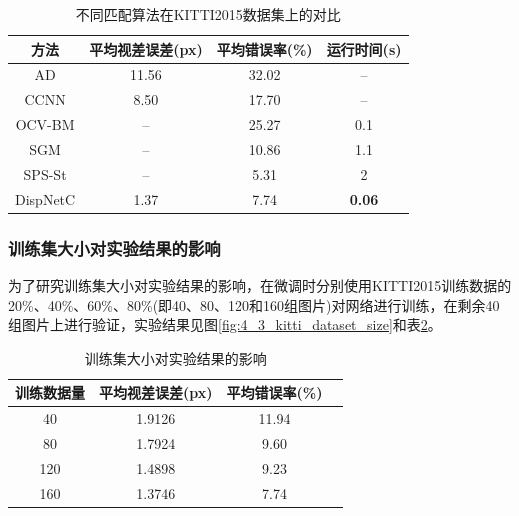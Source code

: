 \begin{table}[!htb]
	\centering
	\caption{不同匹配算法在KITTI2015数据集上的对比}
	\label{tab:4_3_cmp_kitti}
		\begin{tabular}{|c|c|c|c|}\hline
			方法          & 平均视差误差(px) & 平均错误率(\%) & 运行时间(s) \\\hline
			AD            & 11.56                      & 32.02                 & --      \\
			CCNN      & 8.50                       & 17.70                  & --      \\
			OCV-BM &  --                           & 25.27                  &  0.1    \\
			SGM         & --                            & 10.86                 &  1.1     \\
			SPS-St    & --                            & 5.31                    & 2         \\
			DispNetC & 1.37                       & 7.74                   & \textbf{0.06}  \\\hline
		\end{tabular}
\end{table}


\subsubsection{训练集大小对实验结果的影响}
为了研究训练集大小对实验结果的影响，在微调时分别使用KITTI2015训练数据的20\%、40\%、60\%、80\%(即40、80、120和160组图片)对网络进行训练，在剩余40组图片上进行验证，实验结果见图\ref{fig:4_3_kitti_dataset_size}和表\ref{tab:4_3_kitti_dataset_size}。

\begin{table}[!htb]
	\centering
	\caption{训练集大小对实验结果的影响}
	\label{tab:4_3_kitti_dataset_size}
		\begin{tabular}{|c|c|c|c|}\hline
			训练数据量 & 平均视差误差(px) & 平均错误率(\%) \\\hline
			40               & 1.9126                   & 11.94                  \\
			80               & 1.7924                   & 9.60                   \\
			120             & 1.4898                  & 9.23                    \\
			160             & 1.3746                  & 7.74                    \\\hline
		\end{tabular}
\end{table}


